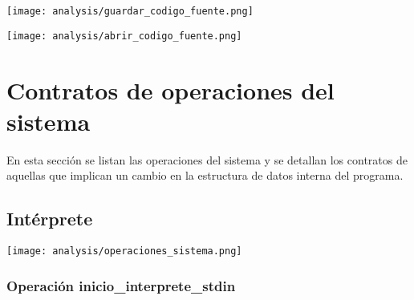 \begin{multicols}{2}
\begin{center}
\texttt{[image: analysis/guardar\_codigo\_fuente.png]} 
\end{center}
\columnbreak
\begin{center}
\texttt{[image: analysis/abrir\_codigo\_fuente.png]} 
\end{center}
\end{multicols}

\section{Contratos de operaciones del sistema}
En esta sección se listan las operaciones del sistema y se detallan los contratos de aquellas
que implican un cambio en la estructura de datos interna del programa. 

\subsection{Intérprete}
\begin{center}
\texttt{[image: analysis/operaciones\_sistema.png]} 
\end{center}
\subsubsection{Operación inicio\_interprete\_stdin}

